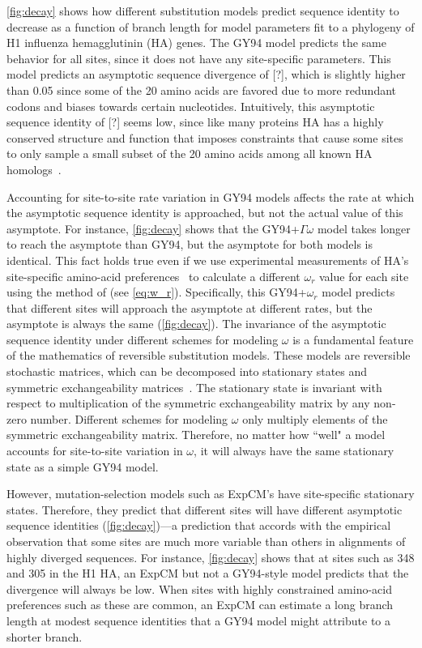 \documentclass[11pt]{article}
\newcommand\jdbcomment[1]{{\color{red}[#1]}}
\begin{document}
\ref{fig:decay} shows how different substitution models predict sequence identity to decrease as a function of branch length for model parameters fit to a phylogeny of H1 influenza hemagglutinin (HA) genes.
The GY94 model predicts the same behavior for all sites, since it does not have any site-specific parameters.
This model predicts an asymptotic sequence divergence of \jdbcomment{?}, which is slightly higher than 0.05 since some of the 20 amino acids are favored due to more redundant codons and biases towards certain nucleotides.
Intuitively, this asymptotic sequence identity of \jdbcomment{?} seems low, since like many proteins HA has a highly conserved structure and function that imposes constraints that cause some sites to only sample a small subset of the 20 amino acids among all known HA homologs~\citep{nobusawa1991comparison}.

Accounting for site-to-site rate variation in GY94 models affects the rate at which the asymptotic sequence identity is approached, but not the actual value of this asymptote. 
For instance, \ref{fig:decay} shows that the GY94+$\Gamma\omega$ model takes longer to reach the asymptote than GY94, but the asymptote for both models is identical. 
This fact holds true even if we use experimental measurements of HA's site-specific amino-acid preferences~\citep{doud2016accurate} to calculate a different $\omega_r$ value for each site using the method of \citet{spielman2015relationship} (see \ref{eq:w_r}).
Specifically, this GY94+$\omega_r$ model predicts that different sites will approach the asymptote at different rates, but the asymptote is always the same (\ref{fig:decay}).
The invariance of the asymptotic sequence identity under different schemes for modeling $\omega$ is a fundamental feature of the mathematics of reversible substitution models.
These models are reversible stochastic matrices, which can be decomposed into stationary states and symmetric exchangeability matrices~\citep{nielsen2006statistical}.
The stationary state is invariant with respect to multiplication of the symmetric exchangeability matrix by any non-zero number.
Different schemes for modeling $\omega$ only multiply elements of the symmetric exchangeability matrix.
Therefore, no matter how ``well" a model accounts for site-to-site variation in $\omega$, it will always have the same stationary state as a simple GY94 model. 

However, mutation-selection models such as ExpCM's have site-specific stationary states.
Therefore, they predict that different sites will have different asymptotic sequence identities (\ref{fig:decay})---a prediction that accords with the empirical observation that some sites are much more variable than others in alignments of highly diverged sequences.
For instance, \ref{fig:decay} shows that at sites such as 348 and 305 in the H1 HA, an ExpCM but not a GY94-style model predicts that the divergence will always be low. 
When sites with highly constrained amino-acid preferences such as these are common, an ExpCM can estimate a long branch length at modest sequence identities that a GY94 model might attribute to a shorter branch.
\end{document}
